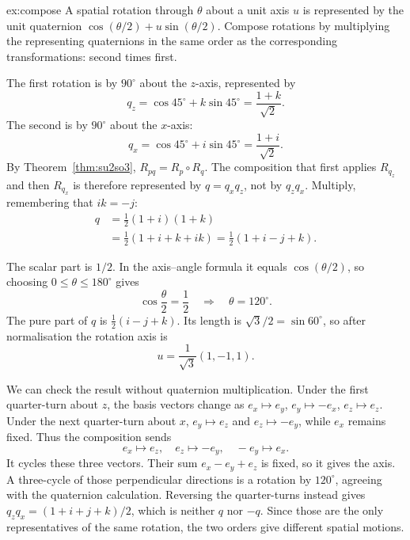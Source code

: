 \begin{solution}{ex:compose}
\idea A spatial rotation through $\theta$ about a unit axis $u$ is represented by the unit quaternion $\cos(\theta/2)+u\sin(\theta/2)$. Compose rotations by multiplying the representing quaternions in the same order as the corresponding transformations: second times first.

\writeup The first rotation is by $90^\circ$ about the $z$-axis, represented by
\[
q_z=\cos45^\circ+k\sin45^\circ=\frac{1+k}{\sqrt2}.
\]
The second is by $90^\circ$ about the $x$-axis:
\[
q_x=\cos45^\circ+i\sin45^\circ=\frac{1+i}{\sqrt2}.
\]
By Theorem~\ref{thm:su2so3}, $R_{pq}=R_p\circ R_q$. The composition that first applies $R_{q_z}$ and then $R_{q_x}$ is therefore represented by $q=q_xq_z$, not by $q_zq_x$. Multiply, remembering that $ik=-j$:
\[
\begin{aligned}
q&=\frac12(1+i)(1+k)\\
&=\frac12(1+i+k+ik)
=\frac12(1+i-j+k).
\end{aligned}
\]

The scalar part is $1/2$. In the axis--angle formula it equals $\cos(\theta/2)$, so choosing $0\le\theta\le180^\circ$ gives
\[
\cos\frac\theta2=\frac12
\quad\Longrightarrow\quad
\boxed{\theta=120^\circ}.
\]
The pure part of $q$ is $\frac12(i-j+k)$. Its length is $\sqrt3/2=\sin60^\circ$, so after normalisation the rotation axis is
\[
\boxed{u=\frac1{\sqrt3}(1,-1,1)}.
\]

We can check the result without quaternion multiplication. Under the first quarter-turn about $z$, the basis vectors change as $e_x\mapsto e_y$, $e_y\mapsto-e_x$, $e_z\mapsto e_z$. Under the next quarter-turn about $x$, $e_y\mapsto e_z$ and $e_z\mapsto-e_y$, while $e_x$ remains fixed. Thus the composition sends
\[
e_x\mapsto e_z,\quad e_z\mapsto-e_y,\quad -e_y\mapsto e_x.
\]
It cycles these three vectors. Their sum $e_x-e_y+e_z$ is fixed, so it gives the axis. A three-cycle of those perpendicular directions is a rotation by $120^\circ$, agreeing with the quaternion calculation. Reversing the quarter-turns instead gives $q_zq_x=(1+i+j+k)/2$, which is neither $q$ nor $-q$. Since those are the only representatives of the same rotation, the two orders give different spatial motions.
\end{solution}

